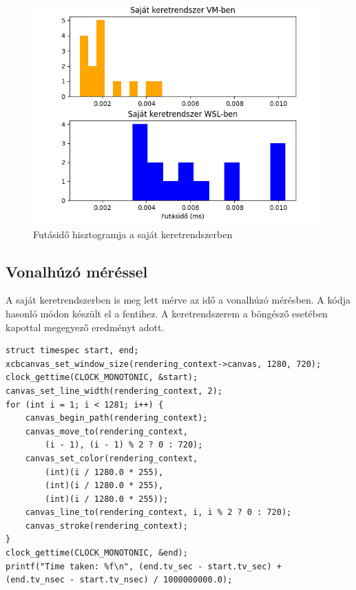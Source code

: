 \begin{figure}[h!]
    \centering
    \includegraphics[width=14truecm]{images/histogram_native.png}
    \caption{Futásidő hisztogramja a saját keretrendszerben}
    \label{fig:hist-own}
\end{figure}

\subsection{Vonalhúzó méréssel}

A saját keretrendszerben is meg lett mérve az idő a vonalhúzó mérésben. A kódja hasonló módon készült el a fentihez. A keretrendszerem a böngésző esetében kapottal megegyező eredményt adott.

\begin{verbatim}
struct timespec start, end;
xcbcanvas_set_window_size(rendering_context->canvas, 1280, 720);
clock_gettime(CLOCK_MONOTONIC, &start);
canvas_set_line_width(rendering_context, 2);
for (int i = 1; i < 1281; i++) {
    canvas_begin_path(rendering_context);
    canvas_move_to(rendering_context,
        (i - 1), (i - 1) % 2 ? 0 : 720);
    canvas_set_color(rendering_context,
        (int)(i / 1280.0 * 255),
        (int)(i / 1280.0 * 255),
        (int)(i / 1280.0 * 255));
    canvas_line_to(rendering_context, i, i % 2 ? 0 : 720);
    canvas_stroke(rendering_context);
}
clock_gettime(CLOCK_MONOTONIC, &end);
printf("Time taken: %f\n", (end.tv_sec - start.tv_sec) +
(end.tv_nsec - start.tv_nsec) / 1000000000.0);
\end{verbatim}

\pagebreak

